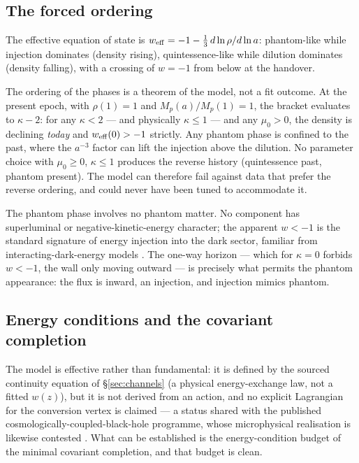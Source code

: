 \documentclass[11pt,a4paper]{article}
\newcommand{\weff}{w_{\rm eff}}
\begin{document}
\subsection{The forced ordering}\label{sec:ordering}

The effective equation of state is $\weff=-1-\tfrac13\,d\ln\rho/d\ln a$: phantom-like while injection dominates (density rising), quintessence-like while dilution dominates (density falling), with a crossing of $w=-1$ from below at the handover.

The ordering of the phases is a theorem of the model, not a fit outcome. At the present epoch, with $\rho(1)=1$ and $M_p(a)/M_p(1)=1$, the bracket evaluates to $\kappa-2$: for any $\kappa<2$ --- and physically $\kappa\le1$ --- and any $\mu_0>0$, the density is declining \emph{today} and $\weff(0)>-1$ strictly. Any phantom phase is confined to the past, where the $a^{-3}$ factor can lift the injection above the dilution. No parameter choice with $\mu_0\ge0$, $\kappa\le1$ produces the reverse history (quintessence past, phantom present). The model can therefore fail against data that prefer the reverse ordering, and could never have been tuned to accommodate it.

The phantom phase involves no phantom matter. No component has superluminal or negative-kinetic-energy character; the apparent $w<-1$ is the standard signature of energy injection into the dark sector, familiar from interacting-dark-energy models \citep{DasCorasanitiKhoury2006,Wang2016}. The one-way horizon --- which for $\kappa=0$ forbids $w<-1$, the wall only moving outward --- is precisely what permits the phantom appearance: the flux is inward, an injection, and injection mimics phantom.

\subsection{Energy conditions and the covariant completion}\label{sec:energyconditions}

The model is effective rather than fundamental: it is defined by the sourced continuity equation of \S\ref{sec:channels} (a physical energy-exchange law, not a fitted $w(z)$), but it is not derived from an action, and no explicit Lagrangian for the conversion vertex is claimed --- a status shared with the published cosmologically-coupled-black-hole programme, whose microphysical realisation is likewise contested \citep{CrokerWeiner2019,Croker2024,GaurVisser2024}. What can be established is the energy-condition budget of the minimal covariant completion, and that budget is clean.
\end{document}
